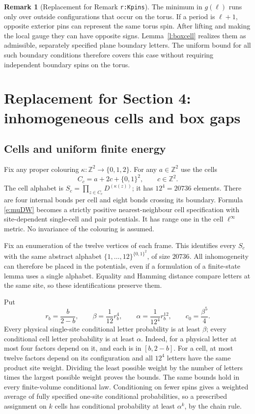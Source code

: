 \documentclass[11pt,reqno]{amsart}
\theoremstyle{definition}
\newtheorem{remark}[theorem]{Remark}
\newcommand{\Z}{\mathbb Z}
\begin{document}
\begin{remark}[Replacement for Remark \texttt{r:Kpins}]\label{r:Kpins}
The minimum in $g(\ell)$ runs only over outside configurations that
occur on the torus. If a period is $\ell+1$, opposite exterior pins
can represent the same torus spin. After lifting and making the local
gauge they can have opposite signs. Lemma~\ref{l:boxcell} realizes
them as admissible, separately specified plane boundary letters.
The uniform bound for all such boundary conditions therefore covers
this case without requiring independent boundary spins on the torus.
\end{remark}

\section{Replacement for Section 4: inhomogeneous cells and box gaps}
\label{s:mixing}

\subsection{Cells and uniform finite energy}

Fix any proper colouring $\kappa:\Z^2\to\{0,1,2\}$. For any
$a\in\Z^2$ use the cells
\[
 C_c=a+2c+\{0,1\}^2,\qquad c\in\Z^2.
\]
The cell alphabet is $S_c=\prod_{z\in C_c}D^{(\kappa(z))}$; it has
$12^4=20736$ elements. There are four internal bonds per cell and eight
bonds crossing its boundary. Formula \eqref{e:muDW} becomes a strictly
positive nearest-neighbour cell specification with site-dependent
single-cell and pair potentials. It has range one in the cell
$\ell^\infty$ metric. No invariance of the colouring is assumed.

Fix an enumeration of the twelve vertices of each frame. This identifies
every $S_c$ with the same abstract alphabet $\{1,\ldots,12\}^{\{0,1\}^2}$,
of size $20736$. All inhomogeneity can therefore be placed in the
potentials, even if a formulation of a finite-state lemma uses a single
alphabet. Equality and Hamming distance compare letters at the same
site, so these identifications preserve them.

Put
\begin{equation}\label{e:energy}
 r_b=\frac{b}{2-b},\qquad
 \beta=\frac1{12}r_b^4,\qquad
 \alpha=\frac1{12^4}r_b^{12},\qquad c_0=\frac{\beta^5}{4}.
\end{equation}
Every physical single-site conditional letter probability is at least
$\beta$; every conditional cell letter probability is at least $\alpha$.
Indeed, for a physical letter at most four factors depend on it, and
each is in $[b,2-b]$. For a cell, at most twelve factors depend on its
configuration and all $12^4$ letters have the same product site weight.
Dividing the least possible weight by the number of letters times the
largest possible weight proves the bounds. The same bounds hold in
every finite-volume conditional law. Conditioning on fewer spins gives
a weighted average of fully specified one-site conditional probabilities,
so a prescribed assignment on $k$ cells has conditional probability at
least $\alpha^k$, by the chain rule.
\end{document}
